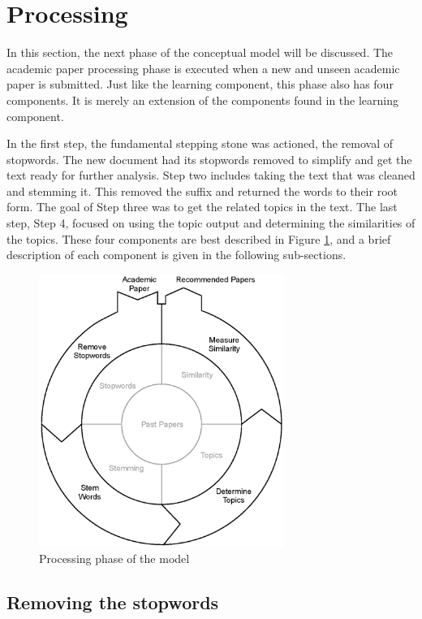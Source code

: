 \section{Processing}

In this section, the next phase of the conceptual model will be discussed. The academic paper processing phase is executed when a new and unseen academic paper is submitted. Just like the learning component, this phase also has four components. It is merely an extension of the components found in the learning component.

In the first step, the fundamental stepping stone was actioned, the removal of stopwords. The new document had its stopwords removed to simplify and get the text ready for further analysis. Step two includes taking the text that was cleaned and stemming it. This removed the suffix and returned the words to their root form. The goal of Step three was to get the related topics in the text. The last step, Step 4, focused on using the topic output and determining the similarities of the topics. These four components are best described in Figure \ref{fig:processing}, and a brief description of each component is given in the following sub-sections.

\begin{figure}[htbp]
\centering
\includegraphics[width=8cm]{./figures/processing1.eps}
\caption{Processing phase of the model}
\label{fig:processing}
\end{figure}

\subsection{Removing the stopwords}

